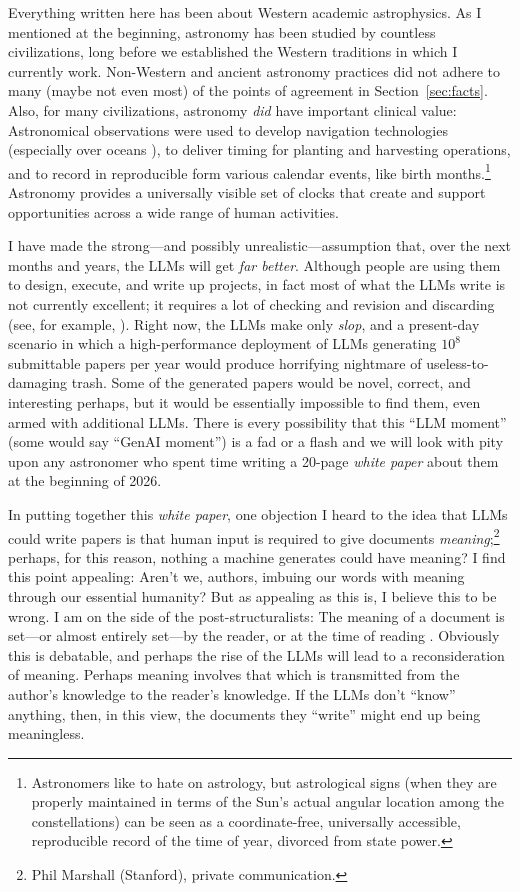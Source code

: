 \documentclass{article}
\newcommand{\documentname}{\textsl{white paper}}
\newcommand{\sectionname}{Section}
\newcommand{\secref}[1]{\sectionname~\ref{#1}}
\begin{document}
Everything written here has been about Western academic astrophysics.
As I mentioned at the beginning, astronomy has been studied by countless civilizations, long before we established the Western traditions in which I currently work.
Non-Western and ancient astronomy practices did not adhere to many (maybe not even most) of the points of agreement in \secref{sec:facts}.
Also, for many civilizations, astronomy \emph{did} have important clinical value:
Astronomical observations were used to develop navigation technologies (especially over oceans \cite{navigation}),
to deliver timing for planting and harvesting operations,
and to record in reproducible form various calendar events, like birth months.\footnote{%
Astronomers like to hate on astrology, but astrological signs (when they are properly maintained in terms of the Sun's actual angular location among the constellations) can be seen as a coordinate-free, universally accessible, reproducible record of the time of year, divorced from state power.}
Astronomy provides a universally visible set of clocks that create and support opportunities across a wide range of human activities.

I have made the strong---and possibly unrealistic---assumption that, over the next months and years, the LLMs will get \emph{far better}.
Although people are using them to design, execute, and write up projects, in fact most of what the LLMs write is not currently excellent; it requires a lot of checking and revision and discarding (see, for example, \cite{bloomvibe}).
Right now, the LLMs make only \emph{slop}, and a present-day scenario in which a high-performance deployment of LLMs generating $10^8$ submittable papers per year would produce horrifying nightmare of useless-to-damaging trash.
Some of the generated papers would be novel, correct, and interesting perhaps, but it would be essentially impossible to find them, even armed with additional LLMs.
There is every possibility that this ``LLM moment'' (some would say ``GenAI moment'') is a fad or a flash and we will look with pity upon any astronomer who spent time writing a 20-page \documentname{} about them at the beginning of 2026.

In putting together this \documentname, one objection I heard to the idea that LLMs could write papers is that human input is required to give documents \emph{meaning};\footnote{Phil Marshall (Stanford), private communication.}
perhaps, for this reason, nothing a machine generates could have meaning?
I find this point appealing: Aren't we, authors, imbuing our words with meaning through our essential humanity?
But as appealing as this is, I believe this to be wrong.
I am on the side of the post-structuralists:
The meaning of a document is set---or almost entirely set---by the reader, or at the time of reading \cite{deadauthor}.
Obviously this is debatable, and perhaps the rise of the LLMs will lead to a reconsideration of meaning.
Perhaps meaning involves that which is transmitted from the author's knowledge to the reader's knowledge.
If the LLMs don't ``know'' anything, then, in this view, the documents they ``write'' might end up being meaningless.
\end{document}
